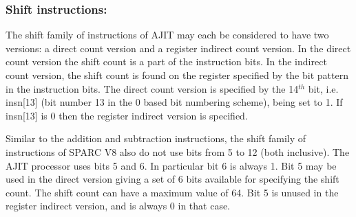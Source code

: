 \subsubsection{Shift instructions:}
\label{sec:shift:insn:impl}
The shift  family of instructions  of AJIT  may each be  considered to
have  two versions:  a direct  count version  and a  register indirect
count version.  In the direct count  version the shift count is a part
of the  instruction bits.   In the indirect  count version,  the shift
count is  found on the  register specified by  the bit pattern  in the
instruction  bits.   The direct  count  version  is specified  by  the
14$^{th}$  bit, i.e.  insn[13]  (bit  number 13  in  the  0 based  bit
numbering scheme), being set to 1.  If insn[13] is 0 then the register
indirect version is specified.

Similar to the addition and subtraction instructions, the shift family
of instructions of  SPARC V8 also do  not use bits from 5  to 12 (both
inclusive).  The AJIT processor uses bits  5 and 6.  In particular bit
6 is always 1.   Bit 5 may be used in the direct  version giving a set
of 6 bits  available for specifying the shift count.   The shift count
can have  a maximum  value of  64.  Bit  5 is  unused in  the register
indirect version, and is always 0 in that case.

